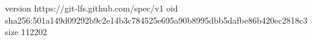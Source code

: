 version https://git-lfs.github.com/spec/v1
oid sha256:501a149d09292b9c2e14b3c784525e695a90b8995dbb5dafbe86b420ec2818c3
size 112202
